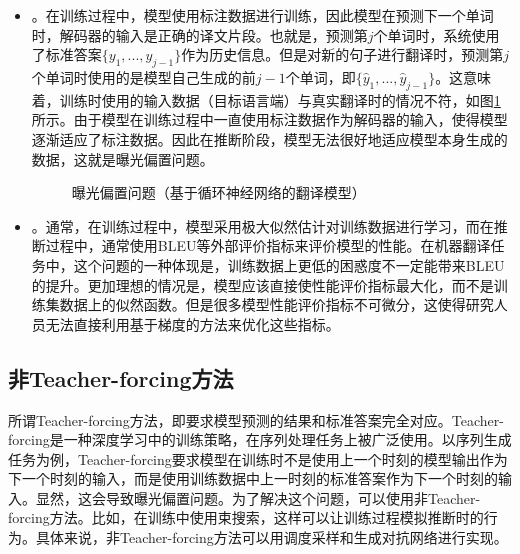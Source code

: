 \begin{itemize}
\vspace{0.5em}
\item {\small{}}。在训练过程中，模型使用标注数据进行训练，因此模型在预测下一个单词时，解码器的输入是正确的译文片段。也就是，预测第$j$个单词时，系统使用了标准答案$\{{y}_1,...,{y}_{j-1}\}$作为历史信息。但是对新的句子进行翻译时，预测第$j$个单词时使用的是模型自己生成的前$j-1$个单词，即$\{\hat{{y}}_1,...,\hat{{y}}_{j-1}\}$。这意味着，训练时使用的输入数据（目标语言端）与真实翻译时的情况不符，如图\ref{fig:13-8}所示。由于模型在训练过程中一直使用标注数据作为解码器的输入，使得模型逐渐适应了标注数据。因此在推断阶段，模型无法很好地适应模型本身生成的数据，这就是曝光偏置问题。
\vspace{0.5em}

\begin{figure}[t]
\centering

\caption{曝光偏置问题（基于循环神经网络的翻译模型）}
\label{fig:13-8}
\end{figure}

\item {\small{}}。通常，在训练过程中，模型采用极大似然估计对训练数据进行学习，而在推断过程中，通常使用BLEU等外部评价指标来评价模型的性能。在机器翻译任务中，这个问题的一种体现是，训练数据上更低的困惑度不一定能带来BLEU的提升。更加理想的情况是，模型应该直接使性能评价指标最大化，而不是训练集数据上的似然函数。但是很多模型性能评价指标不可微分，这使得研究人员无法直接利用基于梯度的方法来优化这些指标。
\vspace{0.5em}
\end{itemize}


\subsection{非Teacher-forcing方法}

\parinterval 所谓Teacher-forcing方法，即要求模型预测的结果和标准答案完全对应。Teacher-forcing是一种深度学习中的训练策略，在序列处理任务上被广泛使用。以序列生成任务为例，Teacher-forcing要求模型在训练时不是使用上一个时刻的模型输出作为下一个时刻的输入，而是使用训练数据中上一时刻的标准答案作为下一个时刻的输入。显然，这会导致曝光偏置问题。为了解决这个问题，可以使用非Teacher-forcing方法。比如，在训练中使用束搜索，这样可以让训练过程模拟推断时的行为。具体来说，非Teacher-forcing方法可以用调度采样和生成对抗网络进行实现。

